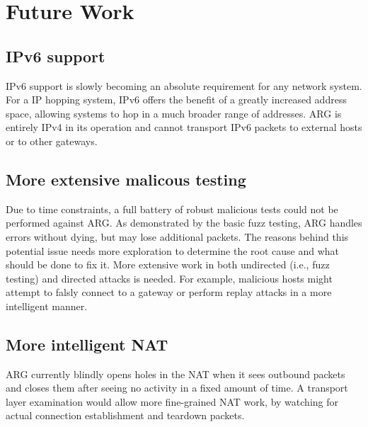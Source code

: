 \section{Future Work}
\label{sec:future_work}
\subsection{IPv6 support}
\par \ac{IPv6} support is slowly becoming an absolute requirement for any network system. For a \ac{IP} hopping system, \ac{IPv6} offers the benefit of a greatly increased address space, allowing systems to hop in a much broader range of addresses. \ac{ARG} is entirely \ac{IPv4} in its operation and cannot transport \ac{IPv6} packets to external hosts or to other gateways.

\subsection{More extensive malicous testing}
\par Due to time constraints, a full battery of robust malicious tests could not be performed against \ac{ARG}. As demonstrated by the basic fuzz testing, \ac{ARG} handles errors without dying, but may lose additional packets. The reasons behind this potential issue needs more exploration to determine the root cause and what should be done to fix it. More extensive work in both undirected (i.e., fuzz testing) and directed attacks is needed. For example, malicious hosts might attempt to falsly connect to a gateway or perform replay attacks in a more intelligent manner.  


\subsection{More intelligent NAT}
\par \ac{ARG} currently blindly opens holes in the \ac{NAT} when it sees outbound packets and closes them after seeing no activity in a fixed amount of time. A transport layer examination would allow more fine-grained \ac{NAT} work, by watching for actual connection establishment and teardown packets. 

